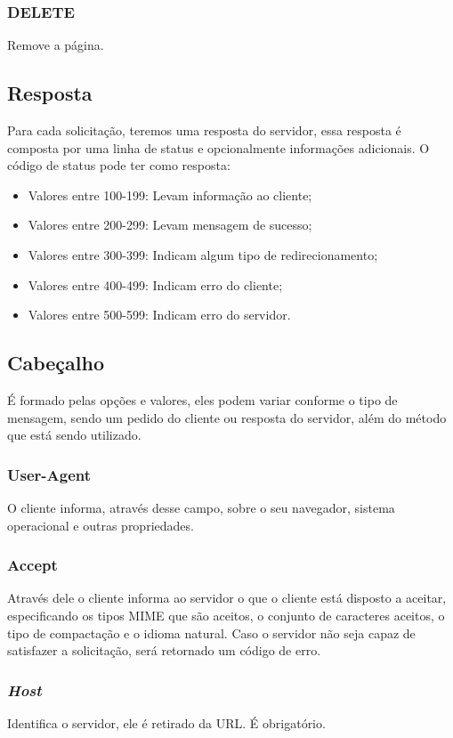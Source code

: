 \subsubsection{DELETE}
Remove a página.

\subsection{Resposta}
Para cada solicitação, teremos uma resposta do servidor, essa resposta é composta por uma linha de status e opcionalmente informações adicionais. O código de status pode ter como resposta:

\begin{itemize}
	\item Valores entre 100-199: Levam informação ao cliente;
	\item Valores entre 200-299: Levam mensagem de sucesso;	
	\item Valores entre 300-399: Indicam algum tipo de redirecionamento;
	\item Valores entre 400-499: Indicam erro do cliente;
	\item Valores entre 500-599: Indicam erro do servidor.		
\end{itemize}

\subsection{Cabeçalho}
É formado pelas opções e valores, eles podem variar conforme o tipo de mensagem, sendo um pedido do cliente ou resposta do servidor, além do método que está sendo utilizado.

\subsubsection{User-Agent}
O cliente informa, através desse campo, sobre o seu navegador, sistema operacional e outras propriedades.

\subsubsection{Accept}
Através dele o cliente informa ao servidor o que o cliente está disposto a aceitar, especificando os tipos MIME que são aceitos, o conjunto de caracteres aceitos, o tipo de compactação e o idioma natural. Caso o servidor não seja capaz de satisfazer a solicitação, será retornado um código de erro.

\subsubsection{\textit{Host}}
Identifica o servidor, ele é retirado da URL. É obrigatório.

